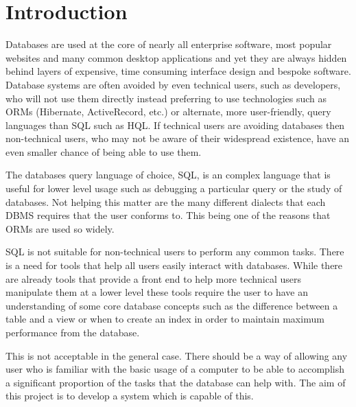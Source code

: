 \chapter{Introduction}

Databases are used at the core of nearly all enterprise software, most popular
websites and many common desktop applications and yet they are always hidden
behind layers of expensive, time consuming interface design and bespoke
software. Database systems are often avoided by even technical users, such as
developers, who will not use them directly instead preferring to use
technologies such as \acp{ORM} (Hibernate, ActiveRecord, etc.) or alternate,
more user-friendly, query languages than \ac{SQL} such as \ac{HQL}. If
technical users are avoiding databases then non-technical users, who may not be
aware of their widespread existence, have an even smaller chance of being able
to use them.

The databases query language of choice, \ac{SQL}, is an complex language that
is useful for lower level usage such as debugging a particular query or the
study of databases. Not helping this matter are the many different dialects
that each \ac{DBMS} requires that the user conforms to. This being one of the
reasons that \acp{ORM} are used so widely.

\ac{SQL} is not suitable for non-technical users to perform any common tasks.
There is a need for tools that help all users easily interact with databases.
While there are already tools that provide a front end to help more technical
users manipulate them at a lower level these tools require the user to have an
understanding of some core database concepts such as the difference between
a table and a view or when to create an index in order to maintain maximum
performance from the database.

This is not acceptable in the general case. There should be a way of allowing
any user who is familiar with the basic usage of a computer to be able to
accomplish a significant proportion of the tasks that the database can help
with. The aim of this project is to develop a system which is capable of this.
